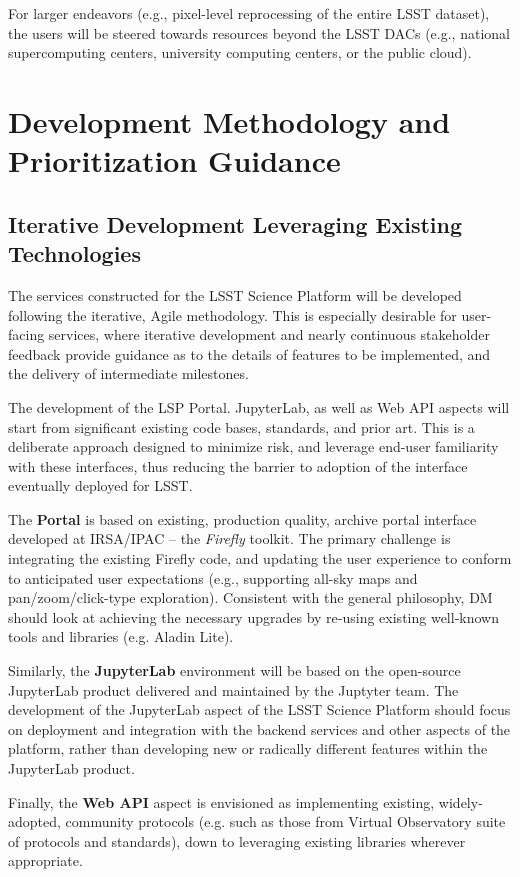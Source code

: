 \documentclass[DM,lsstdraft,toc]{lsstdoc}
\begin{document}
For larger endeavors (e.g., pixel-level reprocessing of the entire LSST
dataset), the users will be steered towards resources beyond the LSST DACs
(e.g., national supercomputing centers, university computing centers, or the
public cloud).

\section{Development Methodology and Prioritization Guidance}

\subsection{Iterative Development Leveraging Existing Technologies }

The services constructed for the LSST Science Platform will be developed following the iterative, Agile methodology. This is especially desirable for user-facing services, where iterative development and nearly continuous stakeholder feedback provide guidance as to the details of features to be implemented, and the delivery of intermediate milestones.

The development of the LSP Portal. JupyterLab, as well as Web API aspects will start from significant existing code bases, standards, and prior art. This is a deliberate approach designed to minimize risk, and leverage end-user familiarity with these interfaces, thus reducing the barrier to adoption of the interface eventually deployed for LSST.

The {\bf Portal} is based on existing, production quality, archive portal interface developed at IRSA/IPAC -- the {\em Firefly} toolkit. The primary challenge is integrating the existing Firefly code, and updating the user experience to conform to anticipated user expectations (e.g., supporting all-sky maps and pan/zoom/click-type exploration). Consistent with the general philosophy, DM should look at achieving the necessary upgrades by re-using existing well-known tools and libraries (e.g. Aladin Lite).

Similarly, the {\bf JupyterLab} environment will be based on the open-source JupyterLab product delivered and maintained by the Juptyter team. The development of the JupyterLab aspect of the LSST Science Platform should focus on deployment and integration with the backend services and other aspects of the platform, rather than developing new or radically different features within the JupyterLab product.

Finally, the {\bf Web API} aspect is envisioned as implementing existing, widely-adopted, community protocols (e.g. such as those from Virtual Observatory suite of protocols and standards), down to leveraging existing libraries wherever appropriate.
\end{document}
